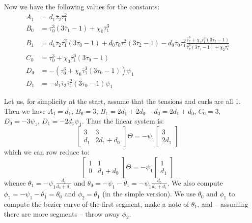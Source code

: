 \documentclass{article}
\begin{document}
Now we have the following values for the constants:
%
\begin{align*}
A_1 &= d_1 \overline{\tau}_2 \overline{\tau}_1^2 \\
%
B_0 &= \tau_0^3 (3 \overline{\tau}_1 - 1) + \chi_0 \overline{\tau}_1^3 \\
%
B_1 &= d_1 \overline{\tau}_2 \overline{\tau}_1^2 (3 \tau_0 - 1) + d_0 \tau_0 \tau_1^2(3 \overline{\tau}_2 - 1) - d_0 \tau_0 \tau_1^2 \frac{\overline{\tau}_2^3 + \chi_2 \tau_1^3 (3 \overline{\tau}_2 - 1)}{\overline{\tau}_2^3 (3 \tau_1 - 1) + \chi_2 \tau_1^3} \\
%
C_0 &= \tau_0^3 + \chi_0 \overline{\tau}_1^3 (3 \tau_0 - 1) \\
%
D_0 &= - (\tau_0^3 + \chi_0 \overline{\tau}_1^3 ( 3 \tau_0 - 1)) \psi_1 \\
%
D_1 &= - d_1 \overline{\tau}_2 \overline{\tau}_1^2 (3 \tau_0 - 1) \psi_1
\end{align*}
%

Let us, for simplicity at the start, assume that the tensions and curls are all \(1\).
Then we have \(A_1 = d_1\), \(B_0 = 3\), \(B_1 = 2 d_1 + 2 d_0 - d_0 = 2 d_1 + d_0\), \(C_0 = 3\), \(D_0 = - 3 \psi_1\), \(D_1 = - 2 d_1 \psi_1\).
Thus the linear system is:
%
\[
  \begin{bmatrix}
  3 & 3 \\
  d_1 & 2 d_1 + d_0
  \end{bmatrix}
  \Theta = - \psi_1 \begin{bmatrix}
  3 \\ 2 d_1
  \end{bmatrix}
\]
%
which we can row reduce to:
%
\[
  \begin{bmatrix}
  1 & 1 \\
  0 & d_1 + d_0 
  \end{bmatrix}
  \Theta = -\psi_1 \begin{bmatrix}
  1 \\ d_1
  \end{bmatrix}
\]
%
whence \(\theta_1 = -\psi_1 \frac{d_1}{d_0 + d_1}\) and \(\theta_0 = -\psi_1 - \theta_1 = -\psi_1\frac{d_0 }{d_0 + d_1}\).
We also compute \(\phi_1 = -\psi_1 - \theta_1 = \theta_0\) and \(\phi_2 = \theta_1\) (in the simple version).
We use \(\theta_0\) and \(\phi_1\) to compute the bezier curve of the first segment, make a note of \(\theta_1\), and -- assuming there are more segments -- throw away \(\phi_2\).
\end{document}
